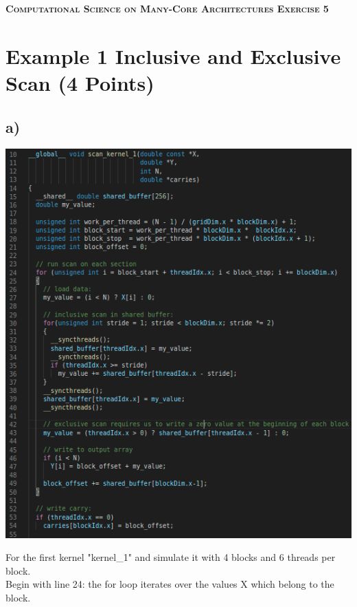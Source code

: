 \documentclass[11pt,a4paper]{article}
\begin{document}
\begin{center}
	\fontsize{24pt}{10pt}\selectfont
	\textsc{\textbf{Computational Science on Many-Core Architectures  Exercise 5}}
\end{center}
\section*{Example 1 Inclusive and Exclusive Scan (4 Points)}
\subsection*{a)}
\begin{center}
	
	\begin{minipage}[t]{0.40\textwidth}
		\includegraphics[width=\textwidth]{Bilder/Ex5_1_1}
	\end{minipage}
	
\end{center}
For the first kernel "kernel\_1" and simulate it with 4 blocks and 6 threads per block.\\
Begin with line 24: the for loop iterates over the values X which belong to the block.\\
\end{document}
